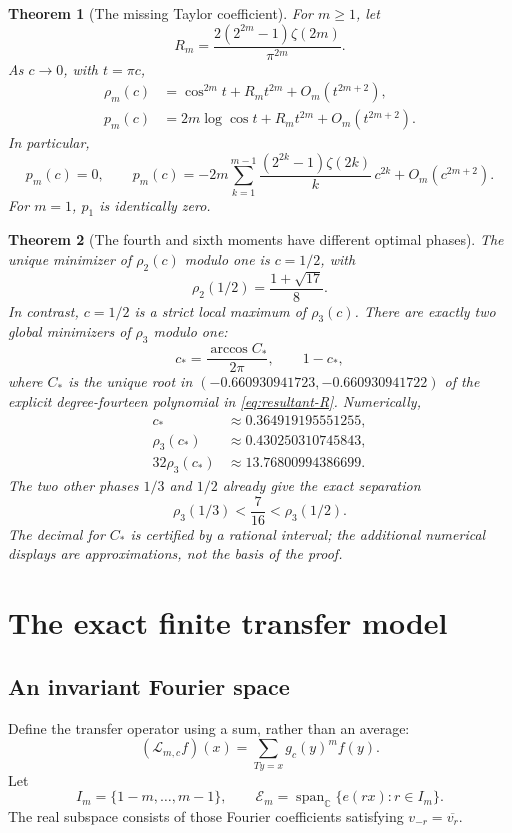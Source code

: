 \documentclass[11pt,a4paper]{article}
\numberwithin{equation}{section}
\newtheorem{theorem}{Theorem}[section]
\theoremstyle{definition}
\theoremstyle{remark}
\newcommand{\CC}{\mathbb C}
\newcommand{\Lop}{\mathcal L}
\begin{document}
\begin{theorem}[The missing Taylor coefficient]
\label{thm:main-jet}
For $m\geq1$, let
\[
 R_m=\frac{2(2^{2m}-1)\zeta(2m)}{\pi^{2m}}.
\]
As $c\to0$, with $t=\pi c$,
\begin{align}
 \rho_m(c)&=\cos^{2m}t+R_m t^{2m}+O_m(t^{2m+2}),
 \label{eq:rho-main-jet}\\
 p_m(c)&=2m\log\cos t+R_m t^{2m}+O_m(t^{2m+2}).
 \label{eq:p-main-jet}
\end{align}
In particular,
\begin{equation}
 [c^{2m}]p_m(c)=0,
 \qquad
 p_m(c)=-2m\sum_{k=1}^{m-1}
 \frac{(2^{2k}-1)\zeta(2k)}{k}\,c^{2k}
 +O_m(c^{2m+2}).
 \label{eq:missing-main}
\end{equation}
For $m=1$, $p_1$ is identically zero.
\end{theorem}

\begin{theorem}[The fourth and sixth moments have different optimal phases]
\label{thm:main-optimum}
The unique minimizer of $\rho_2(c)$ modulo one is $c=1/2$, with
\[
 \rho_2(1/2)=\frac{1+\sqrt{17}}8.
\]
In contrast, $c=1/2$ is a strict local maximum of $\rho_3(c)$.
There are exactly two global minimizers of $\rho_3$ modulo one:
\[
 c_*=\frac{\arccos C_*}{2\pi},\qquad 1-c_*,
\]
where $C_*$ is the unique root in
$(-0.660930941723,-0.660930941722)$ of the explicit degree-fourteen
polynomial in \cref{eq:resultant-R}. Numerically,
\begin{align*}
 c_*&\approx0.364919195551255,\\
 \rho_3(c_*)&\approx0.430250310745843,\\
 32\rho_3(c_*)&\approx13.76800994386699.
\end{align*}
The two other phases $1/3$ and $1/2$ already give the exact separation
\begin{equation}
 \rho_3(1/3)<\frac7{16}<\rho_3(1/2).
 \label{eq:separator-main}
\end{equation}
The decimal for $C_*$ is certified by a rational interval; the additional
numerical displays are approximations, not the basis of the proof.
\end{theorem}

\section{The exact finite transfer model}
\label{sec:finite}

\subsection{An invariant Fourier space}
Define the transfer operator using a sum, rather than an average:
\begin{equation}
 (\Lop_{m,c}f)(x)=\sum_{Ty=x}g_c(y)^m f(y).
 \label{eq:transfer}
\end{equation}
Let
\[
 I_m=\{1-m,\ldots,m-1\},\qquad
 \mathcal E_m=\operatorname{span}_{\CC}\{e(rx):r\in I_m\}.
\]
The real subspace consists of those Fourier coefficients satisfying
$v_{-r}=\overline{v_r}$.
\end{document}
